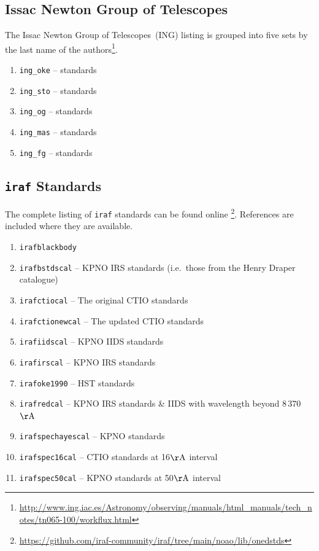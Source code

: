 \documentclass[linenumbers, twocolumn]{aastex631}
\begin{document}
\subsection*{Issac Newton Group of Telescopes}

The Issac Newton Group of Telescopes~(ING) listing is grouped into five sets by the last name of the authors\footnote{\url{http://www.ing.iac.es/Astronomy/observing/manuals/html_manuals/tech_notes/tn065-100/workflux.html}}.

\begin{enumerate}
    \item \texttt{ing\_oke} -- \citet{1990AJ.....99.1621O} standards
    \item \texttt{ing\_sto} -- \citet{1977ApJ...218..767S} standards
    \item \texttt{ing\_og} -- \citet{1983ApJ...266..713O} standards
    \item \texttt{ing\_mas} -- \citet{1988ApJ...328..315M} standards
    \item \texttt{ing\_fg} -- \citet{1984PASP...96..530F} standards
\end{enumerate}

\subsection*{\texttt{iraf} Standards}
The complete listing of \texttt{iraf} standards can be found online
\footnote{\url{https://github.com/iraf-community/iraf/tree/main/noao/lib/onedstds}}.
References are included where they are available.

\begin{enumerate}
    \item \texttt{irafblackbody}
    \item \texttt{irafbstdscal} -- KPNO IRS standards (i.e.\ those from the Henry Draper catalogue)
    \item \texttt{irafctiocal} -- The original CTIO standards \citet{1983MNRAS.204..347S, 1984MNRAS.206..241B}
    \item \texttt{irafctionewcal} -- The updated CTIO standards \citet{1992PASP..104..533H, 1994PASP..106..566H}
    \item \texttt{irafiidscal} -- KPNO IIDS standards \citet{1988ApJ...328..315M}
    \item \texttt{irafirscal} -- KPNO IRS standards \citet{1988ApJ...328..315M}
    \item \texttt{irafoke1990} -- HST standards \citet{1990AJ.....99.1621O}
    \item \texttt{irafredcal} -- KPNO IRS standards \& IIDS \citet{1988ApJ...328..315M} with wavelength beyond 8\,370\,$\mathrm{\AA}$
    \item \texttt{irafspechayescal} -- KPNO standards \citet{1988ApJ...328..315M}
    \item \texttt{irafspec16cal} -- CTIO standards \citet{1992PASP..104..533H, 1994PASP..106..566H} at 16$\mathrm{\AA}$ interval
    \item \texttt{irafspec50cal} -- KPNO standards \citet{1988ApJ...328..315M, 1990ApJ...358..344M} at 50$\mathrm{\AA}$ interval
\end{enumerate}
\end{document}
